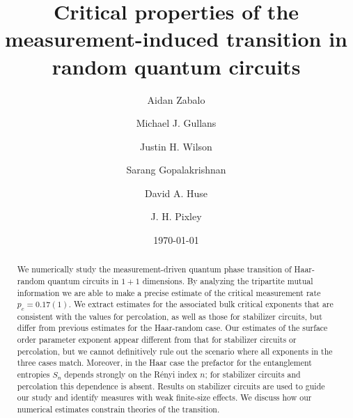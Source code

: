 \documentclass[prl,twocolumn,aps,showpacs,amsmath,amssymb,superscriptaddress,floatfix,longbibliography]{revtex4-1}
\begin{document}
\title{Critical properties of the measurement-induced transition in random quantum circuits}
\author{Aidan Zabalo}
\author{Michael J. Gullans}
\author{Justin H. Wilson}
\author{Sarang Gopalakrishnan}
\author{David A. Huse}
\author{J. H. Pixley}

\date{\today}

\begin{abstract}
We numerically study the measurement-driven quantum phase transition of Haar-random quantum circuits in $1+1$ dimensions.  By analyzing the tripartite mutual information we are able to make a precise estimate of the critical measurement rate $p_c = 0.17(1)$.  We extract estimates for the associated bulk critical exponents that are consistent with the values for percolation, as well as those for stabilizer circuits, but differ from previous estimates for the Haar-random case. 
Our estimates of the surface order parameter exponent appear different from that for stabilizer circuits or percolation, but we cannot definitively rule out the scenario where all exponents in the three cases match.
Moreover, in the Haar case the prefactor for the entanglement entropies $S_n$ depends strongly on the R\'enyi index $n$; for stabilizer circuits and percolation this dependence is absent. Results on stabilizer circuits are used to guide our study and identify measures with weak finite-size effects. We discuss how our numerical estimates constrain theories of the transition.
\end{abstract}

\maketitle
\end{document}

